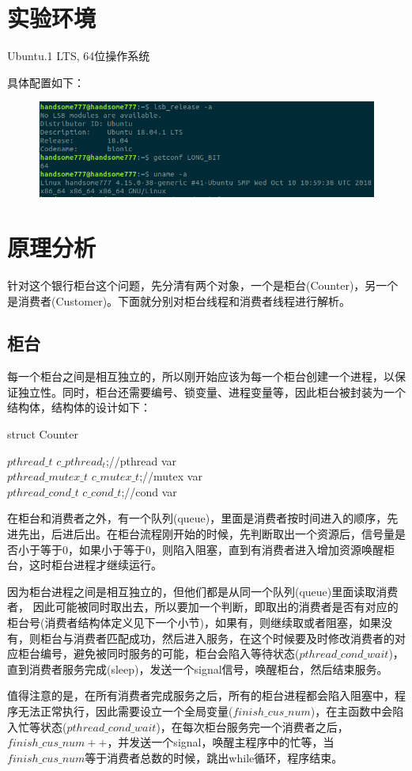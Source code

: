 \documentclass[UTF8]{ctexart}
\begin{document}
\section{实验环境}
Ubuntu.1 \quad LTS, 64位操作系统\par
具体配置如下：\par
\begin{figure}[!h]
\centering
\includegraphics[scale = 0.7,bb=0 0 518 148]{ubuntu_info.png}
\label{img1}
\end{figure}

\section{原理分析}
针对这个银行柜台这个问题，先分清有两个对象，一个是柜台(Counter)，另一个是消费者(Customer)。下面就分别对柜台线程和消费者线程进行解析。\par
\subsection{柜台}
每一个柜台之间是相互独立的，所以刚开始应该为每一个柜台创建一个进程，以保证独立性。同时，柜台还需要编号、锁变量、进程变量等，因此柜台被封装为一个结构体，结构体的设计如下：\par
\begin{algorithm}
\caption{struct Counter}
$pthread\_ t$ $ c\_ pthread_t$;//pthread var\\
$pthread\_ mutex\_ t$ $ c\_ mutex\_ t$;//mutex var\\
$pthread\_ cond\_ t$ $ c\_ cond\_ t$;//cond var\\
\end{algorithm}


在柜台和消费者之外，有一个队列(queue)，里面是消费者按时间进入的顺序，先进先出，后进后出。在柜台流程刚开始的时候，先判断取出一个资源后，信号量是否小于等于0，如果小于等于0，则陷入阻塞，直到有消费者进入增加资源唤醒柜台，这时柜台进程才继续运行。\par
因为柜台进程之间是相互独立的，但他们都是从同一个队列(queue)里面读取消费者，
因此可能被同时取出去，所以要加一个判断，即取出的消费者是否有对应的柜台号(消费者结构体定义见下一个小节)，如果有，则继续取或者阻塞，如果没有，则柜台与消费者匹配成功，然后进入服务，在这个时候要及时修改消费者的对应柜台编号，避免被同时服务的可能，柜台会陷入等待状态($pthread\_ cond\_ wait$)，直到消费者服务完成(sleep)，发送一个signal信号，唤醒柜台，然后结束服务。\par
值得注意的是，在所有消费者完成服务之后，所有的柜台进程都会陷入阻塞中，程序无法正常执行，因此需要设立一个全局变量($finish\_ cus \_ num$)，在主函数中会陷入忙等状态($pthread\_ cond\_ wait$)，在每次柜台服务完一个消费者之后，$finish\_ cus\_ num++$，并发送一个signal，唤醒主程序中的忙等，当$finish\_ cus \_ num$等于消费者总数的时候，跳出while循环，程序结束。\par
\end{document}
